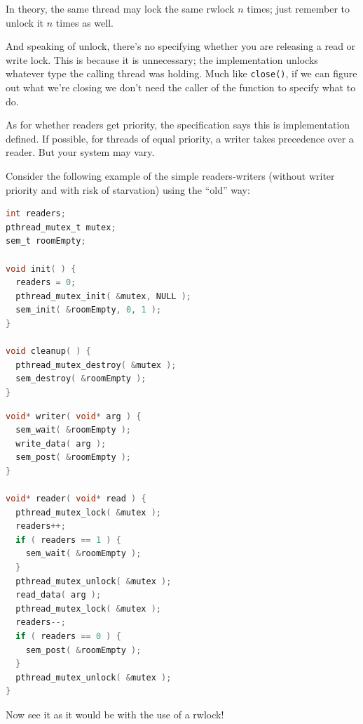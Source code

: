 \documentclass[a4paper]{report}
\begin{document}
In theory, the same thread may lock the same rwlock $n$ times; just remember to unlock it $n$ times as well.

And speaking of unlock, there's no specifying whether you are releasing a read or write lock. This is because it is unnecessary; the implementation unlocks whatever type the calling thread was holding. Much like \texttt{close()}, if we can figure out what we're closing we don't need the caller of the function to specify what to do.

As for whether readers get priority, the specification says this is implementation defined. If possible, for threads of equal priority, a writer takes precedence over a reader. But your system may vary.

Consider the following example of the simple readers-writers (without writer priority and with risk of starvation) using the ``old'' way:

\begin{multicols}{2}
\begin{lstlisting}[language=C]
int readers;
pthread_mutex_t mutex;
sem_t roomEmpty;

void init( ) {
  readers = 0;
  pthread_mutex_init( &mutex, NULL );
  sem_init( &roomEmpty, 0, 1 );
}

void cleanup( ) {
  pthread_mutex_destroy( &mutex );
  sem_destroy( &roomEmpty );
}
\end{lstlisting}

\columnbreak

\begin{lstlisting}[language=C]
void* writer( void* arg ) {
  sem_wait( &roomEmpty );
  write_data( arg );
  sem_post( &roomEmpty );
}

void* reader( void* read ) {
  pthread_mutex_lock( &mutex );
  readers++;
  if ( readers == 1 ) {
    sem_wait( &roomEmpty );
  }
  pthread_mutex_unlock( &mutex );
  read_data( arg );
  pthread_mutex_lock( &mutex );
  readers--;
  if ( readers == 0 ) {
    sem_post( &roomEmpty );
  }
  pthread_mutex_unlock( &mutex );
}
\end{lstlisting}

\end{multicols}

Now see it as it would be with the use of a rwlock!
\end{document}
